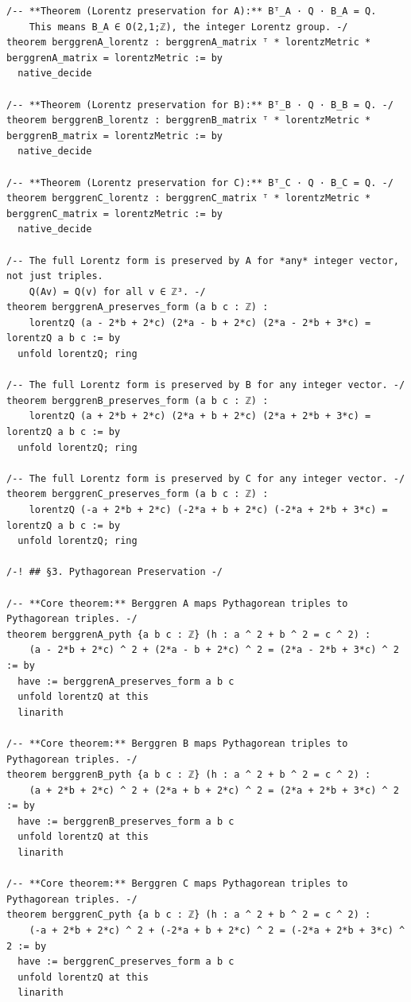 \documentclass[11pt,openany]{book}
\theoremstyle{definition}
\theoremstyle{plain}
\theoremstyle{remark}
\begin{document}
\begin{lstlisting}[style=lean]
/-- **Theorem (Lorentz preservation for A):** Bᵀ_A · Q · B_A = Q.
    This means B_A ∈ O(2,1;ℤ), the integer Lorentz group. -/
theorem berggrenA_lorentz : berggrenA_matrix ᵀ * lorentzMetric * berggrenA_matrix = lorentzMetric := by
  native_decide

/-- **Theorem (Lorentz preservation for B):** Bᵀ_B · Q · B_B = Q. -/
theorem berggrenB_lorentz : berggrenB_matrix ᵀ * lorentzMetric * berggrenB_matrix = lorentzMetric := by
  native_decide

/-- **Theorem (Lorentz preservation for C):** Bᵀ_C · Q · B_C = Q. -/
theorem berggrenC_lorentz : berggrenC_matrix ᵀ * lorentzMetric * berggrenC_matrix = lorentzMetric := by
  native_decide

/-- The full Lorentz form is preserved by A for *any* integer vector, not just triples.
    Q(Av) = Q(v) for all v ∈ ℤ³. -/
theorem berggrenA_preserves_form (a b c : ℤ) :
    lorentzQ (a - 2*b + 2*c) (2*a - b + 2*c) (2*a - 2*b + 3*c) = lorentzQ a b c := by
  unfold lorentzQ; ring

/-- The full Lorentz form is preserved by B for any integer vector. -/
theorem berggrenB_preserves_form (a b c : ℤ) :
    lorentzQ (a + 2*b + 2*c) (2*a + b + 2*c) (2*a + 2*b + 3*c) = lorentzQ a b c := by
  unfold lorentzQ; ring

/-- The full Lorentz form is preserved by C for any integer vector. -/
theorem berggrenC_preserves_form (a b c : ℤ) :
    lorentzQ (-a + 2*b + 2*c) (-2*a + b + 2*c) (-2*a + 2*b + 3*c) = lorentzQ a b c := by
  unfold lorentzQ; ring

/-! ## §3. Pythagorean Preservation -/

/-- **Core theorem:** Berggren A maps Pythagorean triples to Pythagorean triples. -/
theorem berggrenA_pyth {a b c : ℤ} (h : a ^ 2 + b ^ 2 = c ^ 2) :
    (a - 2*b + 2*c) ^ 2 + (2*a - b + 2*c) ^ 2 = (2*a - 2*b + 3*c) ^ 2 := by
  have := berggrenA_preserves_form a b c
  unfold lorentzQ at this
  linarith

/-- **Core theorem:** Berggren B maps Pythagorean triples to Pythagorean triples. -/
theorem berggrenB_pyth {a b c : ℤ} (h : a ^ 2 + b ^ 2 = c ^ 2) :
    (a + 2*b + 2*c) ^ 2 + (2*a + b + 2*c) ^ 2 = (2*a + 2*b + 3*c) ^ 2 := by
  have := berggrenB_preserves_form a b c
  unfold lorentzQ at this
  linarith

/-- **Core theorem:** Berggren C maps Pythagorean triples to Pythagorean triples. -/
theorem berggrenC_pyth {a b c : ℤ} (h : a ^ 2 + b ^ 2 = c ^ 2) :
    (-a + 2*b + 2*c) ^ 2 + (-2*a + b + 2*c) ^ 2 = (-2*a + 2*b + 3*c) ^ 2 := by
  have := berggrenC_preserves_form a b c
  unfold lorentzQ at this
  linarith


\end{lstlisting}
\end{document}
